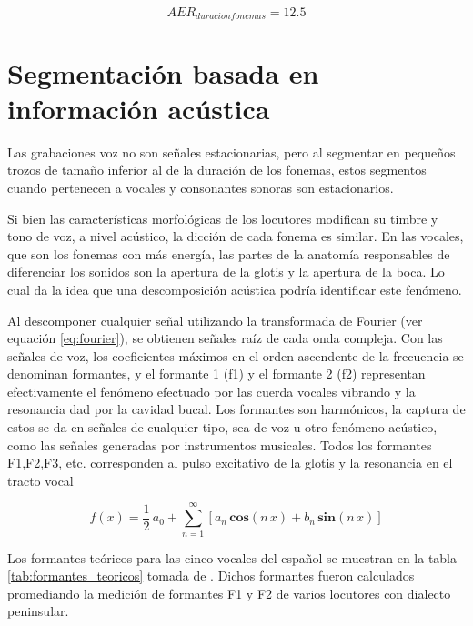 \begin{equation}
    AER_{duracion fonemas} = 12.5
\end{equation}

\section{Segmentación basada en información acústica}

Las grabaciones voz no son señales estacionarias, pero al segmentar en pequeños trozos de tamaño inferior al de la duración de los fonemas, estos segmentos cuando pertenecen a vocales y consonantes sonoras son estacionarios.

Si bien las características morfológicas de los locutores modifican su timbre y tono de voz, a nivel acústico, la dicción de cada fonema es similar. En las vocales, que son los fonemas con más energía, las partes de la anatomía responsables de diferenciar los sonidos son la apertura de la glotis y la apertura de la boca. Lo cual da la idea que una descomposición acústica podría identificar este fenómeno.

Al descomponer cualquier señal utilizando la transformada de Fourier (ver equación \ref{eq:fourier}), se obtienen señales raíz de cada onda compleja. Con las señales de voz, los coeficientes máximos  en el orden ascendente de la frecuencia se denominan formantes, y el formante 1 (f1) y el formante 2 (f2) representan efectivamente el fenómeno efectuado por las cuerda vocales vibrando y la resonancia dad por la cavidad bucal. Los formantes son harmónicos, la captura de estos se da en señales de cualquier tipo, sea de voz u otro fenómeno acústico, como las señales generadas por instrumentos musicales. Todos los formantes F1,F2,F3, etc. corresponden al pulso excitativo de la glotis y la resonancia en el tracto vocal

\begin{equation}
\label{eq:fourier}    
f(x) = \frac{1}{2} \, a_{0} + \sum_{n=1}^{\infty} \left[
   a_{n}\,\mathbf{cos} (n\,x) + b_{n} \,\mathbf{sin} (n\,x) \right]
\end{equation}

Los formantes teóricos para las cinco vocales del español se muestran en la tabla \ref{tab:formantes_teoricos} tomada de \cite{Bradlow1995}. Dichos formantes fueron calculados promediando la medición de formantes F1 y F2 de varios locutores con dialecto peninsular.



